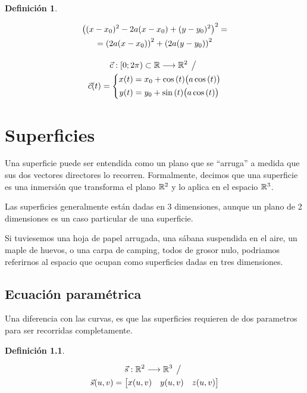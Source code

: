 \documentclass[a5paper,12pt,twoside]{book}
\newtheorem{defn}{{Definición}}[chapter]
\begin{document}

\begin{mdframed}[style=MyFrame1]
    \begin{defn}
    \end{defn}
    \begin{gather*}
        \left( (x-x_0)^2 - 2a(x-x_0) + (y-y_0)^2 \right)^2 = \\
        = \left( 2a(x-x_0) \right)^2 + \left( 2a(y-y_0) \right)^2
        \\[1em]
        \Vec{c}:[0;2 \pi) \subset \mathbb{R} \longrightarrow \mathbb{R}^2 \hspace{1ex} \big/ \hspace{1ex}
        \\
        \Vec{c}(t) = \left\{
        \begin{aligned}
            x(t) &= x_0 + \cos{(t)} \big( a\cos{(t)} \big) \\
            y(t) &= y_0 + \sin{(t)} \big( a\cos{(t)} \big)
        \end{aligned}
        \right.
    \end{gather*}
\end{mdframed}


\chapter{Superficies}

Una superficie puede ser entendida como un plano que se ``arruga'' a medida que sus dos vectores directores lo recorren. Formalmente, decimos que una superficie es una inmersión que transforma el plano $\mathbb{R}^2$ y lo aplica en el espacio $\mathbb{R}^3$.

Las superficies generalmente están dadas en 3 dimensiones, aunque un plano de 2 dimensiones es un caso particular de una superficie.

Si tuviesemos una hoja de papel arrugada, una sábana suspendida en el aire, un maple de huevos, o una carpa de camping, todos de grosor nulo, podriamos referirnos al espacio que ocupan como superficies dadas en tres dimensiones.


\section{Ecuación paramétrica}

Una diferencia con las curvas, es que las superficies requieren de dos parametros para ser recorridas completamente.

\begin{mdframed}[style=MyFrame1]
    \begin{defn}
    \end{defn}
    \begin{multline*}
        \Vec{s}: \mathbb{R}^2 \longrightarrow \mathbb{R}^3 \hspace{1ex} \big/ \hspace{1ex}
        \\
        \Vec{s}(u,v) = \begin{bmatrix} x(u,v) & y(u,v) & z(u,v) \end{bmatrix}
    \end{multline*}
\end{mdframed}
\end{document}
